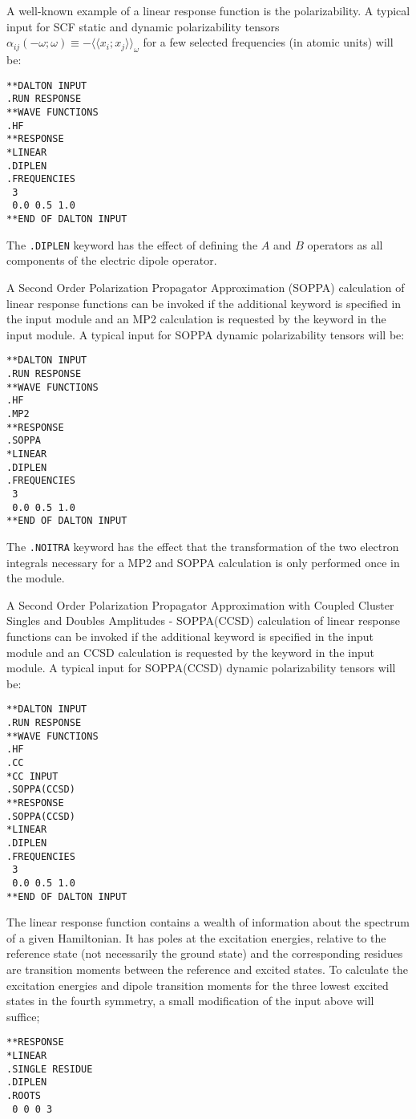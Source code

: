 A well-known example of a linear response
function is the polarizability.
A typical input for SCF static and dynamic polarizability tensors
$\alpha_{ij}(-\omega;\omega)\equiv-\langle\!\langle
x_i;x_j\rangle\!\rangle_\omega$ for a few selected frequencies (in
atomic units) will be:
\begin{verbatim}
**DALTON INPUT
.RUN RESPONSE
**WAVE FUNCTIONS
.HF
**RESPONSE
*LINEAR
.DIPLEN
.FREQUENCIES
 3
 0.0 0.5 1.0
**END OF DALTON INPUT
\end{verbatim}
The {\tt .DIPLEN} keyword has the effect of defining the $A$ and $B$
operators as all components of the electric dipole operator.

A Second Order Polarization Propagator Approximation
(SOPPA)\cite{esnpjjodjcp73,jopjdycpr2,mjpekdtehjajjojcp}
calculation of linear response functions
can be invoked if the additional keyword  is specified in the 
 input module and an MP2 calculation is requested by the 
keyword  in the  input module.  A typical input 
for SOPPA dynamic polarizability tensors  will be:
\begin{verbatim}
**DALTON INPUT
.RUN RESPONSE
**WAVE FUNCTIONS
.HF
.MP2
**RESPONSE
.SOPPA
*LINEAR
.DIPLEN
.FREQUENCIES
 3
 0.0 0.5 1.0
**END OF DALTON INPUT
\end{verbatim}
The {\tt .NOITRA} keyword has the effect that the transformation of the two 
electron integrals necessary for a MP2 and SOPPA calculation is only performed
once in the  module.

A Second Order Polarization Propagator Approximation with Coupled Cluster
Singles and Doubles Amplitudes - SOPPA(CCSD)\cite{soppaccsd}
calculation of linear response functions can be invoked if the additional 
keyword  is specified in the 
 input module and an CCSD calculation is requested by the 
keyword  in the  input module.  A typical input 
for SOPPA(CCSD) dynamic polarizability tensors  will be:
\begin{verbatim}
**DALTON INPUT
.RUN RESPONSE
**WAVE FUNCTIONS
.HF
.CC
*CC INPUT
.SOPPA(CCSD)
**RESPONSE
.SOPPA(CCSD)
*LINEAR
.DIPLEN
.FREQUENCIES
 3
 0.0 0.5 1.0
**END OF DALTON INPUT
\end{verbatim}

The linear response function contains a wealth of
information about the spectrum of a given Hamiltonian. 
It has poles at the excitation
energies, 
relative to the reference state (not necessarily the ground state) and the
corresponding residues are transition
moments between the reference and
excited states. To calculate the excitation energies and dipole transition 
moments for the three lowest excited states
in the fourth symmetry, a small 
modification of the input above will suffice;
\begin{verbatim}
**RESPONSE
*LINEAR
.SINGLE RESIDUE
.DIPLEN
.ROOTS
 0 0 0 3
\end{verbatim}

